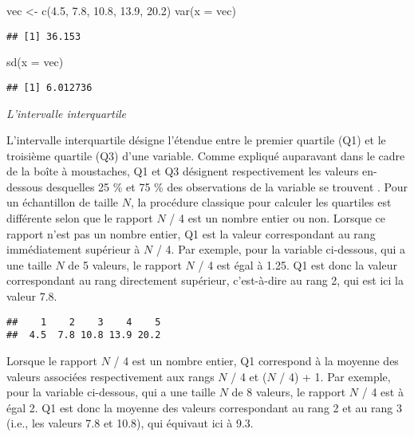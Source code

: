 \documentclass[
]{book}
\newenvironment{Shaded}{\begin{snugshade}}{\end{snugshade}}
\newcommand{\AttributeTok}[1]{\textcolor[rgb]{0.77,0.63,0.00}{#1}}
\newcommand{\FloatTok}[1]{\textcolor[rgb]{0.00,0.00,0.81}{#1}}
\newcommand{\FunctionTok}[1]{\textcolor[rgb]{0.00,0.00,0.00}{#1}}
\newcommand{\NormalTok}[1]{#1}
\newcommand{\OtherTok}[1]{\textcolor[rgb]{0.56,0.35,0.01}{#1}}
\begin{document}
\begin{Shaded}
\begin{Highlighting}[]
\NormalTok{vec }\OtherTok{\textless{}{-}} \FunctionTok{c}\NormalTok{(}\FloatTok{4.5}\NormalTok{, }\FloatTok{7.8}\NormalTok{, }\FloatTok{10.8}\NormalTok{, }\FloatTok{13.9}\NormalTok{, }\FloatTok{20.2}\NormalTok{)}
\FunctionTok{var}\NormalTok{(}\AttributeTok{x =}\NormalTok{ vec)}
\end{Highlighting}
\end{Shaded}

\begin{verbatim}
## [1] 36.153
\end{verbatim}

\begin{Shaded}
\begin{Highlighting}[]
\FunctionTok{sd}\NormalTok{(}\AttributeTok{x =}\NormalTok{ vec)}
\end{Highlighting}
\end{Shaded}

\begin{verbatim}
## [1] 6.012736
\end{verbatim}

\emph{L'intervalle interquartile}

L'intervalle interquartile désigne l'étendue entre le premier quartile (Q1) et le troisième quartile (Q3) d'une variable. Comme expliqué auparavant dans le cadre de la boîte à moustaches, Q1 et Q3 désignent respectivement les valeurs en-dessous desquelles 25 \% et 75 \% des observations de la variable se trouvent \autocite{chatellierMoyenneMedianeLeurs2003}. Pour un échantillon de taille \(N\), la procédure classique pour calculer les quartiles est différente selon que le rapport \(N\) / 4 est un nombre entier ou non. Lorsque ce rapport n'est pas un nombre entier, Q1 est la valeur correspondant au rang immédiatement supérieur à \(N\) / 4. Par exemple, pour la variable ci-dessous, qui a une taille \(N\) de 5 valeurs, le rapport \(N\) / 4 est égal à 1.25. Q1 est donc la valeur correspondant au rang directement supérieur, c'est-à-dire au rang 2, qui est ici la valeur 7.8.

\begin{verbatim}
##    1    2    3    4    5 
##  4.5  7.8 10.8 13.9 20.2
\end{verbatim}

Lorsque le rapport \(N\) / 4 est un nombre entier, Q1 correspond à la moyenne des valeurs associées respectivement aux rangs \(N\) / 4 et (\(N\) / 4) + 1. Par exemple, pour la variable ci-dessous, qui a une taille \(N\) de 8 valeurs, le rapport \(N\) / 4 est à égal 2. Q1 est donc la moyenne des valeurs correspondant au rang 2 et au rang 3 (i.e., les valeurs 7.8 et 10.8), qui équivaut ici à 9.3.
\end{document}
